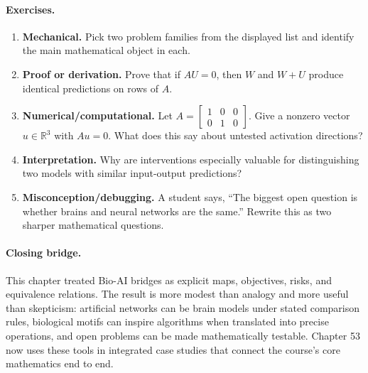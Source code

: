\paragraph{Exercises.}
\begin{enumerate}[label=\textbf{52.4.\arabic*.}, leftmargin=*]
\item \textbf{Mechanical.} Pick two problem families from the displayed list and identify the main mathematical object in each.
\item \textbf{Proof or derivation.} Prove that if \(AU=0\), then \(W\) and \(W+U\) produce identical predictions on rows of \(A\).
\item \textbf{Numerical/computational.} Let \(A=\begin{bmatrix}1&0&0\\0&1&0\end{bmatrix}\). Give a nonzero vector \(u\in\mathbb R^3\) with \(Au=0\). What does this say about untested activation directions?
\item \textbf{Interpretation.} Why are interventions especially valuable for distinguishing two models with similar input-output predictions?
\item \textbf{Misconception/debugging.} A student says, ``The biggest open question is whether brains and neural networks are the same.'' Rewrite this as two sharper mathematical questions.
\end{enumerate}

\paragraph{Closing bridge.}
This chapter treated Bio-AI bridges as explicit maps, objectives, risks, and equivalence relations. The result is more modest than analogy and more useful than skepticism: artificial networks can be brain models under stated comparison rules, biological motifs can inspire algorithms when translated into precise operations, and open problems can be made mathematically testable. Chapter 53 now uses these tools in integrated case studies that connect the course's core mathematics end to end.

\clearpage
